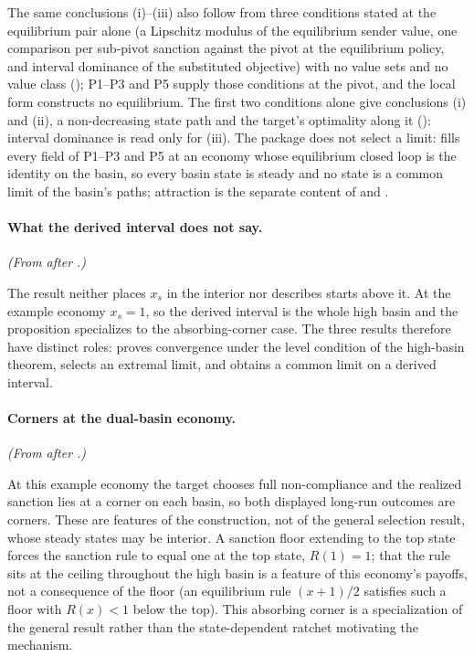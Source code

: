 The same
conclusions (i)--(iii) also follow from three conditions stated at the
equilibrium pair alone (a Lipschitz modulus of the equilibrium sender
value, one comparison per sub-pivot sanction against the pivot at the
equilibrium policy, and interval dominance of the substituted objective)
with no value sets and no value class
(); P1--P3 and P5
supply those conditions at the pivot, and the local form constructs no
equilibrium. The first two conditions alone give conclusions (i) and (ii),
a non-decreasing state path and the target's optimality along it
(): interval
dominance is read only for (iii). The package does not select a limit:
 fills every field of
P1--P3 and P5 at an economy whose equilibrium closed loop is the identity on
the basin, so every basin state is steady and no state is a common limit of
the basin's paths; attraction is the separate content of
 and .

\paragraph{What the derived interval does not say.} \emph{(From after .)}

The result neither places $x_s$ in the interior nor describes starts above it. At
the example economy $x_s=1$, so the derived interval is the whole high basin
and the proposition specializes to the absorbing-corner case. The three results
therefore have distinct roles:  proves convergence under the
level condition of the high-basin theorem,  selects an extremal limit,
and  obtains a common limit on a derived interval.

\paragraph{Corners at the dual-basin economy.} \emph{(From after .)}

At this example economy the target chooses full non-compliance and the realized
sanction lies at a corner on each basin, so both displayed long-run outcomes are
corners. These are features of the construction, not of the general selection
result, whose steady states may be interior. A sanction floor extending to the top
state forces the sanction rule to equal one at the top state, $R(1)=1$; that
the rule sits at the ceiling throughout the high basin is a feature of this
economy's payoffs, not a consequence of the floor (an equilibrium rule
$(x+1)/2$ satisfies such a floor with $R(x)<1$ below the top). This
absorbing corner is a specialization of the general result rather than the
state-dependent ratchet motivating the mechanism.

